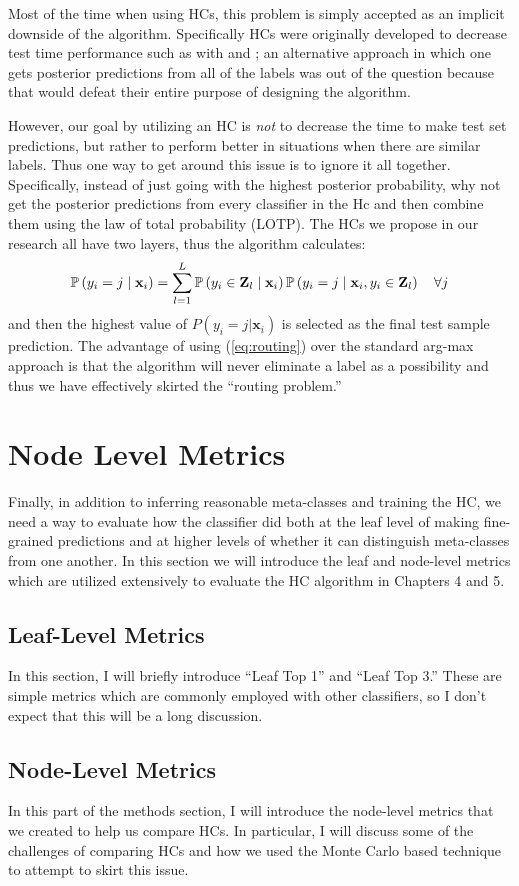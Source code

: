 \documentclass[../thesis.tex]{subfiles}
\begin{document}
Most of the time when using HCs, this problem is simply accepted as an implicit downside of the algorithm. Specifically HCs were originally developed to decrease test time performance such as with \cite{vural2004hierarchical} and \cite{bengio2010label}; an alternative approach in which one gets posterior predictions from all of the labels was out of the question because that would defeat their entire purpose of designing the algorithm.

However, our goal by utilizing an HC is \textit{not} to decrease the time to make test set predictions, but rather to perform better in situations when there are similar labels. Thus one way to get around this issue is to ignore it all together. Specifically, instead of just going with the highest posterior probability, why not get the posterior predictions from every classifier in the Hc and then combine them using the law of total probability (LOTP). The HCs we propose in our research all have two layers, thus the algorithm calculates:
\begin{equation}
    \label{eq:routing}
    \P\left(y_i = j \mid \mathbf{x}_i \right) = \sum_{l=1}^L \P\left(y_i \in \mathbf{Z}_l \mid \mathbf{x}_i\right) \P\left(y_i = j \mid \mathbf{x}_i, y_i \in \mathbf{Z}_l\right) \quad \forall j
\end{equation}
and then the highest value of $P(y_i = j | \mathbf{x}_i)$ is selected as the final test sample prediction. The advantage of using (\ref{eq:routing}) over the standard arg-max approach is that the algorithm will never eliminate a label as a possibility and thus we have effectively skirted the ``routing problem.''

\section{Node Level Metrics}
Finally, in addition to inferring reasonable meta-classes and training the HC, we need a way to evaluate how the classifier did both at the leaf level of making fine-grained predictions and at higher levels of whether it can distinguish meta-classes from one another. In this section we will introduce the leaf and node-level metrics which are utilized extensively to evaluate the HC algorithm in Chapters 4 and 5. 

\subsection{Leaf-Level Metrics}
In this section, I will briefly introduce ``Leaf Top 1'' and ``Leaf Top 3.'' These are simple metrics which are commonly employed with other classifiers, so I don't expect that this will be a long discussion.

\subsection{Node-Level Metrics}
In this part of the methods section, I will introduce the node-level metrics that we created to help us compare HCs. In particular, I will discuss some of the challenges of comparing HCs and how we used the Monte Carlo based technique to attempt to skirt this issue. 
\end{document}
